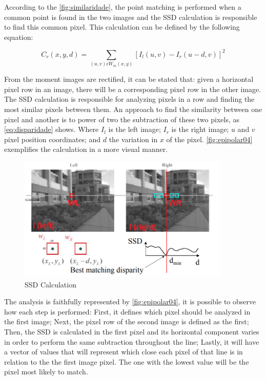     According to the \autoref{fig:similaridade}, the point matching is performed when a common point is found in the two images and the SSD calculation is responsible to find this common pixel. This calculation can be defined by the following equation:
    
    \begin{center}
        \begin{equation}\label{eq:disparidade}
        C_{r}(x, y, d) = \sum_{(u,v)\epsilon W_{m}(x,y)}[I_{l}(u,v)-I_{r}(u-d, v)]^{2}
        \end{equation}
    \end{center}
    
    From the moment images are rectified, it can be stated that: given a horizontal pixel row in an image, there will be a corresponding pixel row in the other image. The SSD calculation is responsible for analyzing pixels in a row and finding the most similar pixels between them. An approach to find the similarity between one pixel and another is to power of two the subtraction of these two pixels, as \autoref{eq:disparidade} shows. Where \(I_{l}\) is the left image; \(I_{r}\) is the right image; \(u\) and \(v\) pixel position coordinates; and \(d\) the variation in \(x\) of the pixel. \autoref{fig:epipolar04} exemplifies the calculation in a more visual manner.
    
    \begin{figure}[H]
     \caption{\label{fig:epipolar04}
SSD Calculation}
     \begin{center}
        \includegraphics[width=0.9\textwidth]{images/matching_point.png}
     \end{center}
    \end{figure}
    
    The analysis is faithfully represented by \autoref{fig:epipolar04}, it is possible to observe how each step is performed: First, it defines which pixel should be analyzed in the first image; Next, the pixel row of the second image is defined as the first; Then, the SSD is calculated in the first pixel and its horizontal component varies in order to perform the same subtraction throughout the line; Lastly, it will have a vector of values that will represent which close each pixel of that line is in relation to the the first image pixel. The one with the lowest value will be the pixel most likely to match.
    
